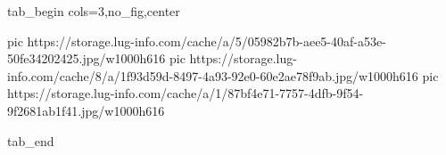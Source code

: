  
 
 
 
 


\ifcmt
  tab_begin cols=3,no_fig,center

     pic https://storage.lug-info.com/cache/a/5/05982b7b-aee5-40af-a53e-50fe34202425.jpg/w1000h616%
		 pic https://storage.lug-info.com/cache/8/a/1f93d59d-8497-4a93-92e0-60e2ae78f9ab.jpg/w1000h616%
		 pic https://storage.lug-info.com/cache/a/1/87bf4e71-7757-4dfb-9f54-9f2681ab1f41.jpg/w1000h616%

  tab_end
\fi

